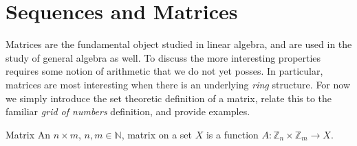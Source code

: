 \section{Sequences and Matrices}
    Matrices are the fundamental object studied in
    linear algebra, and are used in the study of general
    algebra as well. To discuss the more interesting properties requires some
    notion of arithmetic that we do not yet posses. In particular, matrices are
    most interesting when there is an underlying \textit{ring}
    structure. For now we simply introduce the set theoretic definition of a
    matrix, relate this to the familiar \textit{grid of numbers} definition, and
    provide examples.
    \begin{fdefinition}{Matrix}
        An $n\times{m}$, $n,m\in\mathbb{N}$, matrix on a set $X$ is a function
        $A:\mathbb{Z}_{n}\times\mathbb{Z}_{m}\rightarrow{X}$.
    \end{fdefinition}